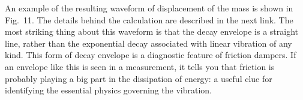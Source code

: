   An example of the resulting waveform of displacement of the mass is shown in 
  Fig.\ 11. The details behind the calculation are described in the next link. 
  The most striking thing about this waveform is that the decay envelope is a 
  straight line, rather than the exponential decay associated with linear 
  vibration of any kind. This form of decay envelope is a diagnostic feature of 
  friction dampers. If an envelope like this is seen in a measurement, it tells 
  you that friction is probably playing a big part in the dissipation of 
  energy: a useful clue for identifying the essential physics governing the 
  vibration. 

